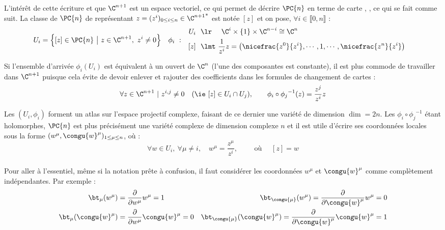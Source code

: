L'intérêt de cette écriture et que $\C^{n+1}$ est un espace vectoriel, ce qui permet de décrire $\PC{n}$ en terme de carte \cite[lemme 2.17, p. 64]{lafontaine_introduction_2015}, \cite[chap. 2]{ballmann_lectures_2006}, ce qui se fait comme suit.
La classe de $\PC{n}$ de représentant $z = (z^i)_{0\leq i\leq n}\in{\C^{n+1}}^*$ est notée $[z]$ et on pose, $\forall i\in\llbracket0,n\rrbracket$ :
\begin{align}
	U_i &= \Big\{[z]\in\PC{n}\ \big|\ z\in \C^{n+1},\ z^i\neq 0\Big\}  &  \phi_i\  :\quad &\begin{aligned}
		U_i\ \ &\lr\quad\ \C^{i}\times \{1\} \times\C^{n-i}\cong \C^{n} \\ [z]\ \ &\lmt\ \frac{1}{z^i}z = \big(\nicefrac{z^0}{z^i},\cdots, 1, \cdots, \nicefrac{z^n}{z^i}\big)
	\end{aligned}
\end{align}
\begin{remarque}
	Si l'ensemble d'arrivée $\phi_i(U_i)$ est équivalent à un ouvert de $\C^{n}$ (l'une des composantes est constante), il est plus commode de travailler dans $\C^{n+1}$ puisque cela évite de devoir enlever et rajouter des coefficients dans les formules de changement de cartes :
	\[ \forall z\in\C^{n+1}\ |\ z^{i,j}\neq 0\quad (\ie~[z]\in U_i\cap U_j) ,\qquad \phi_i \circ {\phi_j}^{-1}(z) = \frac{z^j}{z^i}z\]
\end{remarque}
\skipl
Les $(U_i,\phi_i)$ forment un atlas sur l'espace projectif complexe, faisant de ce dernier une variété de dimension $\dim = 2n$. Les $\phi_i \circ {\phi_j}^{-1}$ étant holomorphes, $\PC{n}$ est plus précisément une variété complexe de dimension complexe $n$ et il est utile d'écrire ses coordonnées locales sous la forme $(w^\mu, \congu{w}^\mu)_{1\leq \mu \leq n}$, où :
\[\forall w\in U_i,\ \forall \mu\neq i,\quad w^\mu = \frac{z^\mu}{z^i},\qquad  \text{ où }\quad [z] = w\]
\\
 Pour aller à l'essentiel, même si la notation prête à confusion, il faut considérer les coordonnées $w^\mu$ et $\congu{w}^\mu$ comme complètement indépendantes.
Par exemple :
\begin{align*}
	\bt_\mu(w^\mu) &= \frac{\partial}{\partial w^\mu} w^\mu = 1  &  
	\bt_{\congu{\mu}}(w^\mu) = \frac{\partial}{\partial \congu{w}^\mu} w^\mu &= 0 
	\\
	\bt_\mu(\congu{w}^\mu) &= \frac{\partial}{\partial w^\mu} \congu{w}^\mu = 0  &  
	\bt_{\congu{\mu}}(\congu{w}^\mu) = \frac{\partial}{\partial \congu{w}^\mu} \congu{w}^\mu &= 1
\end{align*}
